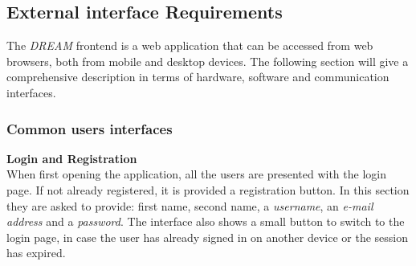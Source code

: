 \subsection{External interface Requirements}
The \emph{DREAM} frontend is a web application that can be accessed from web browsers, both from mobile and
desktop devices. The following section will give a comprehensive description in terms of hardware, software
and communication interfaces.

\subsubsection{Common users interfaces}
\textbf{Login and Registration}\\
When first opening the application, all the users are presented with the login page. If not already registered,
it is provided a registration button. In this section they are asked to provide: first name, second name,
a \emph{username}, an \emph{e-mail address} and a \emph{password}. The interface also shows a small button to switch
to the login page, in case the user has already signed in on another device or the session has expired.

